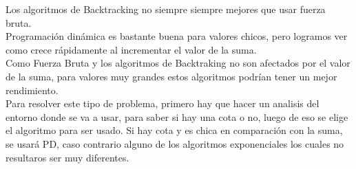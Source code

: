 Los algoritmos de Backtracking no siempre siempre mejores que usar fuerza bruta.\\
Programaci\'on din\'amica es bastante buena para valores chicos, pero logramos ver como crece r\'apidamente al incrementar el valor de la suma.\\
Como Fuerza Bruta y los algoritmos de Backtraking no son afectados por el valor de la suma, para valores muy grandes estos algoritmos podr\'ian tener un mejor rendimiento.\\
Para resolver este tipo de problema, primero hay que hacer un analisis del entorno donde se va a usar, para saber si hay una cota o no, luego de eso se elige el algoritmo para ser usado. Si hay cota y es chica en comparaci\'on con la suma, se usará PD, caso contrario alguno de los algoritmos exponenciales los cuales no resultaros ser muy diferentes.
